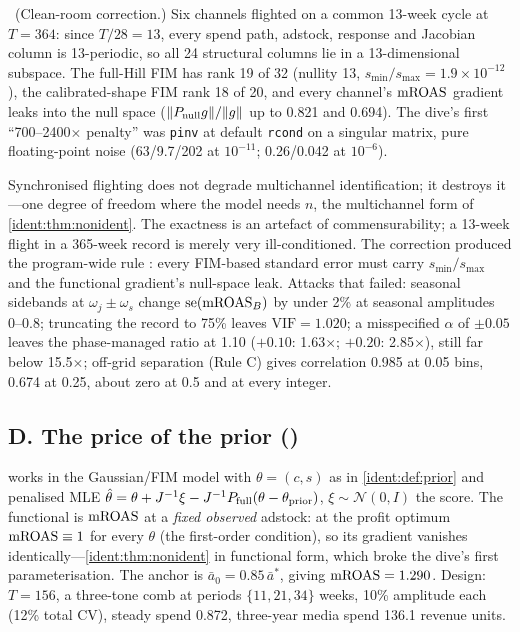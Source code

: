 \begin{proposition}
\label{ident:prop:singular}
\tagEstablished\ (Clean-room correction.) Six channels flighted on a common 13-week cycle at $T = 364$: since $T/28 = 13$, every spend path, adstock, response and Jacobian column is 13-periodic, so all 24 structural columns lie in a 13-dimensional subspace. The full-Hill FIM has rank 19 of 32 (nullity 13, $s_{\min}/s_{\max} = 1.9\times10^{-12}$), the calibrated-shape FIM rank 18 of 20, and every channel's $\mathrm{mROAS}$ gradient leaks into the null space ($\|P_{\rm null}g\|/\|g\|$ up to 0.821 and 0.694). The dive's first ``700--2400$\times$ penalty'' was \texttt{pinv} at default \texttt{rcond} on a singular matrix, pure floating-point noise (63/9.7/202 at $10^{-11}$; 0.26/0.042 at $10^{-6}$).
\end{proposition}

Synchronised flighting does not degrade multichannel identification; it destroys it---one degree of freedom where the model needs $n$, the multichannel form of \cref{ident:thm:nonident}. The exactness is an artefact of commensurability; a 13-week flight in a 365-week record is merely very ill-conditioned. The correction produced the program-wide rule : every FIM-based standard error must carry $s_{\min}/s_{\max}$ and the functional gradient's null-space leak. Attacks that failed: seasonal sidebands at $\omega_j \pm \omega_s$ change $\mathrm{se}(\mathrm{mROAS}_B)$ by under 2\% at seasonal amplitudes 0--0.8; truncating the record to 75\% leaves $\mathrm{VIF} = 1.020$; a misspecified $\alpha$ of $\pm0.05$ leaves the phase-managed ratio at 1.10 ($+0.10$: 1.63$\times$; $+0.20$: 2.85$\times$), still far below 15.5$\times$; off-grid separation (Rule C) gives correlation 0.985 at 0.05 bins, 0.674 at 0.25, about zero at 0.5 and at every integer.

\subsection{D. The price of the prior ()}

 works in the Gaussian/FIM model with $\theta = (c, s)$ as in \cref{ident:def:prior} and penalised MLE $\hat\theta = \theta + J^{-1}\xi - J^{-1}P_{\rm full}(\theta - \theta_{\rm prior})$, $\xi \sim \mathcal N(0, I)$ the score. The functional is $\mathrm{mROAS}$ at a \emph{fixed observed} adstock: at the profit optimum $\mathrm{mROAS} \equiv 1$ for every $\theta$ (the first-order condition), so its gradient vanishes identically---\cref{ident:thm:nonident} in functional form, which broke the dive's first parameterisation. The anchor is $\bar a_0 = 0.85\,\bar a^*$, giving $\mathrm{mROAS} = 1.290$. Design: $T = 156$, a three-tone comb at periods $\{11, 21, 34\}$ weeks, 10\% amplitude each (12\% total CV), steady spend 0.872, three-year media spend 136.1 revenue units.

